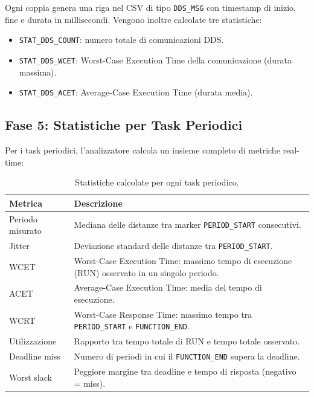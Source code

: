 Ogni coppia genera una riga nel CSV di tipo \texttt{DDS\_MSG} con
timestamp di inizio, fine e durata in millisecondi. Vengono inoltre
calcolate tre statistiche:

\begin{itemize}
    \item \texttt{STAT\_DDS\_COUNT}: numero totale di comunicazioni DDS.
    \item \texttt{STAT\_DDS\_WCET}: Worst-Case Execution Time della
          comunicazione (durata massima).
    \item \texttt{STAT\_DDS\_ACET}: Average-Case Execution Time
          (durata media).
\end{itemize}

\subsection{Fase 5: Statistiche per Task Periodici}
\label{subsec:stats}

Per i task periodici, l'analizzatore calcola un insieme completo di
metriche real-time:

\begin{table}[htbp]
\centering
\caption{Statistiche calcolate per ogni task periodico.}
\label{tab:stats}
\begin{tabular}{lp{8cm}}
\toprule
\textbf{Metrica} & \textbf{Descrizione} \\
\midrule
Periodo misurato & Mediana delle distanze tra marker \texttt{PERIOD\_START}
                   consecutivi. \\
Jitter & Deviazione standard delle distanze tra \texttt{PERIOD\_START}. \\
WCET & Worst-Case Execution Time: massimo tempo di esecuzione (RUN)
       osservato in un singolo periodo. \\
ACET & Average-Case Execution Time: media del tempo di esecuzione. \\
WCRT & Worst-Case Response Time: massimo tempo tra \texttt{PERIOD\_START}
       e \texttt{FUNCTION\_END}. \\
Utilizzazione & Rapporto tra tempo totale di RUN e tempo totale
                osservato. \\
Deadline miss & Numero di periodi in cui il \texttt{FUNCTION\_END}
               supera la deadline. \\
Worst slack & Peggiore margine tra deadline e tempo di risposta
              (negativo = miss). \\
\bottomrule
\end{tabular}
\end{table}



